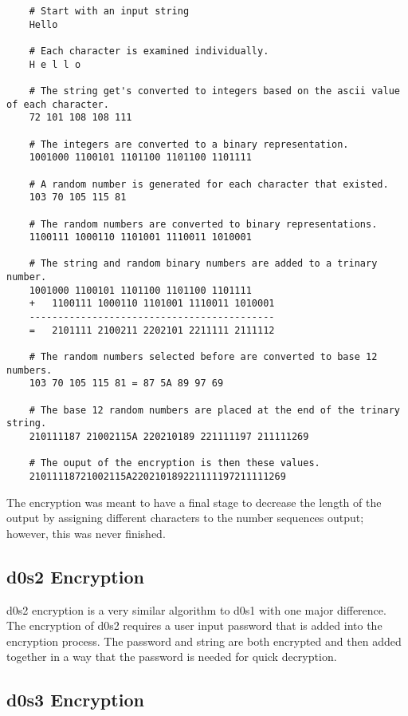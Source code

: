 \begin{lstlisting}
	# Start with an input string
	Hello
	
	# Each character is examined individually.
	H e l l o
	
	# The string get's converted to integers based on the ascii value of each character.
	72 101 108 108 111
	
	# The integers are converted to a binary representation.
	1001000 1100101 1101100 1101100 1101111
	
	# A random number is generated for each character that existed.
	103 70 105 115 81
	
	# The random numbers are converted to binary representations.
	1100111 1000110 1101001 1110011 1010001
	
	# The string and random binary numbers are added to a trinary number.
	1001000 1100101 1101100 1101100 1101111
	+	1100111 1000110 1101001 1110011 1010001
	-------------------------------------------
	=	2101111 2100211 2202101 2211111 2111112
	
	# The random numbers selected before are converted to base 12 numbers.
	103 70 105 115 81 = 87 5A 89 97 69
	
	# The base 12 random numbers are placed at the end of the trinary string.
	210111187 21002115A 220210189 221111197 211111269
	
	# The ouput of the encryption is then these values.
	21011118721002115A220210189221111197211111269
\end{lstlisting}

The encryption was meant to have a final stage to decrease the length of the output by assigning different characters to the number sequences output; however, this was never finished.

\subsection{d0s2 Encryption}

d0s2 encryption is a very similar algorithm to d0s1 with one major difference. The encryption of d0s2 requires a user input password that is added into the encryption process. The password and string are both encrypted and then added together in a way that the password is needed for quick decryption.

\subsection{d0s3 Encryption}

